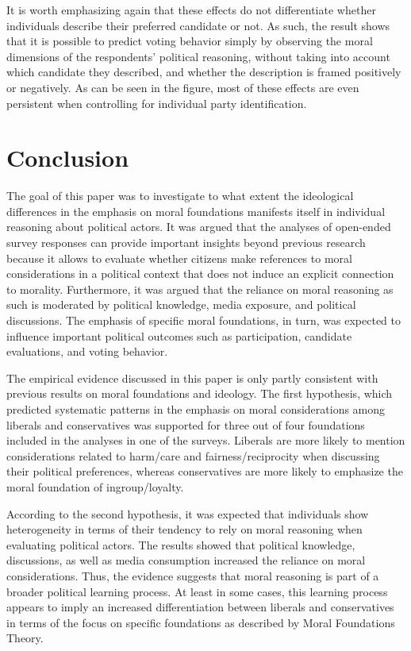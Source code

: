 \documentclass[12pt]{article}
\begin{document}
It is worth emphasizing again that these effects do not differentiate whether individuals describe their preferred candidate or not. As such, the result shows that it is possible to predict voting behavior simply by observing the moral dimensions of the respondents' political reasoning, without taking into account which candidate they described, and whether the description is framed positively or negatively. As can be seen in the figure, most of these effects are even persistent when controlling for individual party identification.


\section{Conclusion}

The goal of this paper was to investigate to what extent the ideological differences in the emphasis on moral foundations manifests itself in individual reasoning about political actors. It was argued that the analyses of open-ended survey responses can provide important insights beyond previous research because it allows to evaluate whether citizens make references to moral considerations in a political context that does not induce an explicit connection to morality. Furthermore, it was argued that the reliance on moral reasoning as such is moderated by political knowledge, media exposure, and political discussions. The emphasis of specific moral foundations, in turn, was expected to influence important political outcomes such as participation, candidate evaluations, and voting behavior.

The empirical evidence discussed in this paper is only partly consistent with previous results on moral foundations and ideology. The first hypothesis, which predicted systematic patterns in the emphasis on moral considerations among liberals and conservatives was supported for three out of four foundations included in the analyses in one of the surveys. Liberals are more likely to mention considerations related to harm/care and fairness/reciprocity when discussing their political preferences, whereas conservatives are more likely to emphasize the moral foundation of ingroup/loyalty.

According to the second hypothesis, it was expected that individuals show heterogeneity in terms of their tendency to rely on moral reasoning when evaluating political actors. The results showed that political knowledge, discussions, as well as media consumption increased the reliance on moral considerations. Thus, the evidence suggests that moral reasoning is part of a broader political learning process. At least in some cases, this learning process appears to imply an increased differentiation between liberals and conservatives in terms of the focus on specific foundations as described by Moral Foundations Theory.
\end{document}
